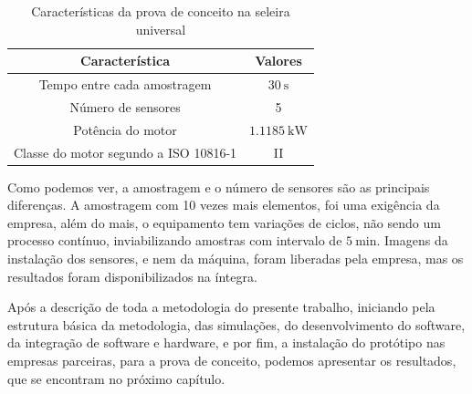 \begin{table}[H]
    \caption{Características da prova de conceito na seleira universal}
    \label{tab:seleira_universal}
    \centering%
    \begin{minipage}{.55\textwidth}
      \begin{tabular*}{\textwidth}{c|c}
        \hline
        Característica                          & Valores                                    \\ \hline
        \hline
        Tempo entre cada amostragem             &  $\SI{30}{\second}$                        \\
        Número de sensores                      &  5                                         \\ 
        Potência do motor                       &  $\SI{1.1185}{\kilo\watt}$                 \\
        Classe do motor segundo a  ISO 10816-1  &  II                                         \\
      \end{tabular*}
    \end{minipage}
  \end{table}

Como podemos ver, a amostragem e o número de sensores são as principais diferenças. A amostragem com 10 vezes mais elementos, foi uma exigência
da empresa, além do mais, o equipamento tem variações de ciclos, não sendo um processo contínuo, inviabilizando amostras com intervalo de 
$\SI{5}{\minute}$. Imagens da instalação dos sensores, e nem da máquina, foram liberadas pela empresa, mas os resultados foram 
disponibilizados na íntegra.

Após a descrição de toda a metodologia do presente trabalho, iniciando pela estrutura básica da metodologia, das simulações, do desenvolvimento
do software, da integração de software e hardware, e por fim, a instalação do protótipo nas empresas parceiras, para a prova de conceito, 
podemos apresentar os resultados, que se encontram no próximo capítulo.